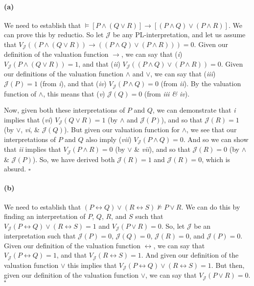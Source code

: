 \documentclass[sloppy, journal, git, bytitle]{humapap}
\begin{document}
\paragraph{(a)} We need to establish that $\vDash[P\wedge (Q\vee R)]\rightarrow[(P\wedge Q)\vee(P\wedge R)]$. 
We can prove this by reductio. 
So let $\mathcal{J}$ be any PL-interpretation, and let us assume that 
$V\mathcal{_J}((P\wedge (Q\vee R))\rightarrow((P\wedge Q)\vee(P\wedge R)))=0$. 
Given our definition of the valuation function $\rightarrow$, we can say that 
(\emph{i}) $V\mathcal{_J}(P\wedge (Q\vee R))=1$, and that 
(\emph{ii}) $V\mathcal{_J}((P\wedge Q)\vee(P\wedge R))=0$. 
Given our definitions of the valuation function $\wedge$ and $\vee$, we can say that 
(\emph{iii}) $\mathcal{J}(P)=1$ (from \emph{i}), and that 
(\emph{iv}) $V\mathcal{_J}(P\wedge Q)=0$ (from \emph{ii}). 
By the valuation function of $\wedge$, this means that 
(\emph{v}) $\mathcal{J}(Q)=0$ (from \emph{iii \& iv}). 

Now, given both these interpretations of $P$ and $Q$, we can demonstrate that \emph{i} implies that 
(\emph{vi}) $V\mathcal{_J}(Q\vee R)=1$ (by $\wedge$ and $\mathcal{J}(P)$), 
and so that $\mathcal{J}(R)=1$ (by $\vee$, \emph{vi}, \& $\mathcal{J}(Q)$). 
But given our valuation function for $\wedge$, we see that our interpretations of $P$ and $Q$ also imply  
(\emph{vii}) $V\mathcal{_J}(P\wedge Q)=0$. 
And so we can show that \emph{ii} implies that 
$V\mathcal{_J}(P\wedge R)=0$ (by $\vee$ \& \emph{vii}), and so that 
$\mathcal{J}(R)=0$ (by $\wedge$ \& $\mathcal{J}(P)$). 
So, we have derived both $\mathcal{J}(R)=1$ and $\mathcal{J}(R)=0$, which is absurd. $\square$

\paragraph{(b)} We need to establish that $(P\leftrightarrow Q)\vee(R\leftrightarrow S)\nvDash P\vee R$.
We can do this by finding an interpretation of $P$, $Q$, $R$, and $S$ such that 
$V\mathcal{_J}(P\leftrightarrow Q)\vee(R\leftrightarrow S)=1$ and 
$V\mathcal{_J}(P\vee R)=0$. 
So, let $\mathcal{J}$ be an interpretation such that 
$\mathcal{J}(P)=0$, 
$\mathcal{J}(Q)=0$, 
$\mathcal{J}(R)=0$, and 
$\mathcal{J}(P)=0$. 
Given our definition of the valuation function $\leftrightarrow$, we can say that 
$V\mathcal{_J}(P\leftrightarrow Q)=1$, and that 
$V\mathcal{_J}(R\leftrightarrow S)=1$.
And given our definition of the valuation function $\vee$ this implies that 
$V\mathcal{_J}(P\leftrightarrow Q)\vee(R\leftrightarrow S)=1$. 
But then, given our definition of the valuation function $\vee$, we can say that 
$V\mathcal{_J}(P\vee R)=0$. $\square$ 
\end{document}
